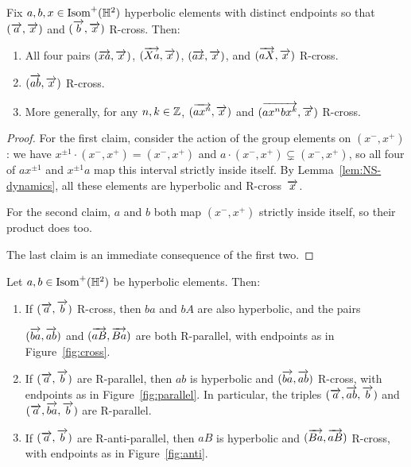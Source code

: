 \begin{lemma}
  Fix $a,b,x \in \operatorname{Isom}^+(\mathbb{H}^2)$ hyperbolic elements with distinct
  endpoints so that $(\overrightarrow{a},\overrightarrow{x})$ and $(\overrightarrow{b},\overrightarrow{x})$
  R-cross. Then:
  \begin{enumerate}[label=(\Roman*)]
  \item All four pairs $(\overrightarrow{xa},\overrightarrow{x})$, $(\overrightarrow{Xa},\overrightarrow{x})$, $(\overrightarrow{ax},\overrightarrow{x})$, and
    $(\overrightarrow{aX},\overrightarrow{x})$ R-cross.
  \item $(\overrightarrow{ab},\overrightarrow{x})$ R-cross.
  \item More generally, for any $n,k \in \mathbb{Z}$, $(\overrightarrow{a x^n},\overrightarrow{x})$
    and $(\overrightarrow{ax^nbx^k},\overrightarrow{x})$ R-cross.
  \end{enumerate}
    \label{lem:rhs_prod}
\end{lemma}
\begin{proof}
  For the first claim, consider the action of the group
  elements on $(x^-,x^+)$: we have
  $x^{\pm1} \cdot (x^-,x^+) = (x^-,x^+)$ and
  $a \cdot (x^-,x^+) \subsetneq (x^-,x^+)$, so all four of $ax^{\pm1}$ and
  $x^{\pm1}a$ map this interval strictly inside itself. By Lemma~\ref{lem:NS-dynamics},
  all these elements are hyperbolic and R-cross~$\overrightarrow{x}$.

  For the second claim, $a$ and $b$ both map
  $(x^-,x^+)$ strictly inside itself, so their product does too.

  The last claim is an immediate consequence of the first two.
\end{proof}


\begin{lemma} 
  Let $a,b\in \operatorname{Isom}^+(\mathbb{H}^2)$ be hyperbolic elements. Then:
  \begin{enumerate}[label=(\Roman*)]
  \item\label{item:ab-cross} If $(\overrightarrow{a}, \overrightarrow{b})$ R-cross, then $ba$ and $bA$ are also
    hyperbolic, and the pairs

    $(\overrightarrow{ba},\overrightarrow{ab})$ and $(\overrightarrow{aB},\overrightarrow{Ba})$ are both
    R-parallel, with endpoints as in Figure~\ref{fig:cross}.
  \item\label{item:ab-parallel} If $(\overrightarrow{a},\overrightarrow{b})$ are R-parallel, then $ab$ is hyperbolic
    and $(\overrightarrow{ba},\overrightarrow{ab})$ R-cross, with endpoints as in
    Figure~\ref{fig:parallel}.
    In particular, the triples
    $(\overrightarrow{a},\overrightarrow{ab}, \overrightarrow{b})$ and $(\overrightarrow{a},\overrightarrow{ba},\overrightarrow{b})$ are R-parallel.
  \item If $(\overrightarrow{a},\overrightarrow{b})$ are R-anti-parallel, then $aB$ is
    hyperbolic and $(\overrightarrow{Ba},\overrightarrow{aB})$ R-cross, with endpoints as in Figure~\ref{fig:anti}.
  \end{enumerate}
  \label{lem:righthandedfoundation}
\end{lemma}



